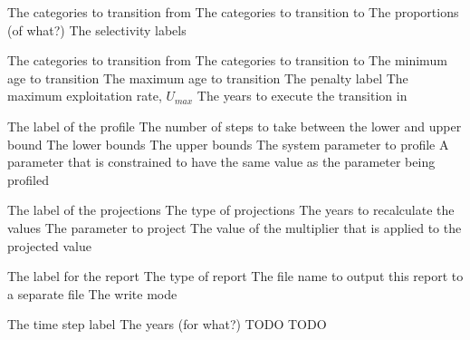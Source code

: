 \par\textbf{}\par
{} {The categories to transition from}
 {The categories to transition to}
 {The proportions (of what?)}
 {The selectivity labels}

\par\textbf{}\par
{} {The categories to transition from}
 {The categories to transition to}
 {The minimum age to transition}
 {The maximum age to transition}
 {The penalty label}
 {The maximum exploitation rate, $U_{max}$}
 {The years to execute the transition in}

\par\par
{} {The label of the profile}
 {The number of steps to take between the lower and upper bound}
 {The lower bounds}
 {The upper bounds}
 {The system parameter to profile}
 {A parameter that is constrained to have the same value as the parameter being profiled}

\par\par
{} {The label of the projections}
 {The type of projections}
 {The years to recalculate the values}
 {The parameter to project}
 {The value of the multiplier that is applied to the projected value}

\par\par
{} {The label for the report}
 {The type of report}
 {The file name to output this report to a separate file}
 {The write mode}

\par\textbf{}\par
{} {The time step label}
 {The years (for what?)}
 {TODO}
 {TODO}

